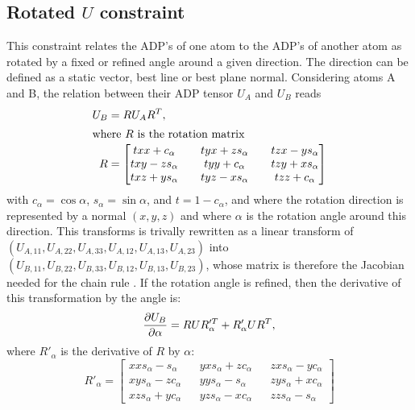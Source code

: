 \documentclass[pdf]{iucr}
\begin{document}
\subsection{Rotated $U$ constraint}
This constraint relates the ADP's of one atom to the ADP's of another atom as rotated by a fixed or refined angle around a given direction. The direction can be defined as a static vector, best line or best plane normal. Considering atoms A and B, the relation between their ADP tensor $U_A$ and $U_B$ reads
\begin{align}
U_{B} &= RU_{A}R^{T}, \\
\intertext{where $R$ is the rotation matrix}
R &=
  \begin{bmatrix} 
    txx + c_\alpha && tyx + zs_\alpha && tzx - ys_\alpha \\
    txy - zs_\alpha && tyy + c_\alpha && tzy + xs_\alpha \\
    txz + ys_\alpha && tyz - xs_\alpha && tzz + c_\alpha \\
  \end{bmatrix}
  \label{eqn:rotmat}
\end{align}
with $c_\alpha=\cos\alpha$, $s_\alpha=\sin\alpha$, and $t=1-c_\alpha$, and where the rotation direction is represented by a normal $(x,y,z)$ and where $\alpha$ is the rotation angle around this direction. This transforms is trivally rewritten as a linear transform of $(U_{A,11}, U_{A,22}, U_{A,33}, U_{A,12}, U_{A,13}, U_{A,23})$ into $(U_{B,11}, U_{B,22}, U_{B,33}, U_{B,12}, U_{B,13}, U_{B,23})$, whose matrix is therefore the Jacobian needed for the chain rule . If the rotation angle is refined, then the derivative of this transformation by the angle is:
\begin{equation}
\frac{\partial U_{B}}{\partial \alpha} = RUR_\alpha^{\prime T} + R'_\alpha U R^{T},
\end{equation}
where $R'_\alpha$ is the derivative of $R$ by $\alpha$:
\begin{equation}
R'_\alpha = 
  \begin{bmatrix} 
    xx s_\alpha -  s_\alpha && yx s_\alpha + z c_\alpha && zx s_\alpha - y c_\alpha \\
    xy s_\alpha - z c_\alpha && yy s_\alpha -  s_\alpha && zy s_\alpha + x c_\alpha \\
    xz s_\alpha + y c_\alpha && yz s_\alpha - x c_\alpha && zz s_\alpha - s_\alpha
  \end{bmatrix}
  \label{eqn:rotmatdev}
\end{equation}
\end{document}
